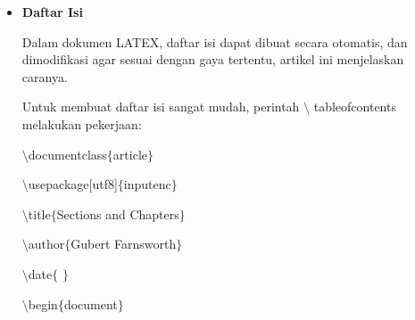 \begin{itemize}
anyt\hspace*{0.5in}\hspace*{0.5in}\hspace*{0.5in}sort by alphabetic label, name, year, title\par

anyvt\hspace*{0.5in}\hspace*{0.5in}\hspace*{0.5in}sort by alphabetic label, name, year, volume, title\par

ydtn\hspace*{0.5in}\hspace*{0.5in}\hspace*{0.5in}sort by year (descending), name, title\par

none\hspace*{0.5in}\hspace*{0.5in}\hspace*{0.5in}entries are processed in citation order\par

\vspace{12pt}
	\item {\fontsize{14pt}{14pt}\selectfont \textbf{Daftar Isi}}\par

Dalam dokumen LATEX, daftar isi dapat dibuat secara otomatis, dan dimodifikasi agar sesuai dengan gaya tertentu, artikel ini menjelaskan caranya.\par

Untuk membuat daftar isi sangat mudah, perintah $\setminus$ tableofcontents melakukan pekerjaan:\par

\hspace*{0.5in}$\setminus$documentclass$ \{ $article$ \} $\par

$\setminus$usepackage[utf8]$ \{ $inputenc$ \} $\par

$\setminus$title$ \{ $Sections and Chapters$ \} $\par

$\setminus$author$ \{ $Gubert Farnsworth$ \} $\par

$\setminus$date$ \{ $ $ \} $\par

$\setminus$begin$ \{ $document$ \} $\par


\end{itemize}

